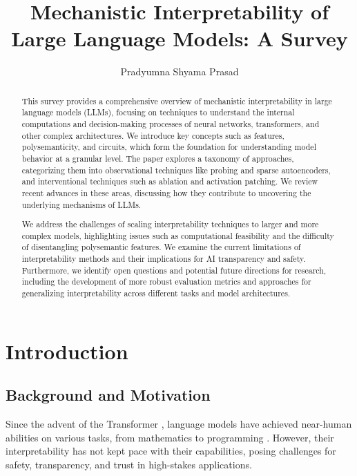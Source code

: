 \documentclass[sigconf,authoryear]{acmart}
\title{Mechanistic Interpretability of Large Language Models: A Survey}
\author{Pradyumna Shyama Prasad}
\begin{document}
\begin{abstract}
  This survey provides a comprehensive overview of mechanistic interpretability in large language models (LLMs), focusing on techniques to understand the internal computations and decision-making processes of neural networks, transformers, and other complex architectures. We introduce key concepts such as features, polysemanticity, and circuits, which form the foundation for understanding model behavior at a granular level. The paper explores a taxonomy of approaches, categorizing them into observational techniques like probing and sparse autoencoders, and interventional techniques such as ablation and activation patching. We review recent advances in these areas, discussing how they contribute to uncovering the underlying mechanisms of LLMs.

  We address the challenges of scaling interpretability techniques to larger and more complex models, highlighting issues such as computational feasibility and the difficulty of disentangling polysemantic features. We examine the current limitations of interpretability methods and their implications for AI transparency and safety. Furthermore, we identify open questions and potential future directions for research, including the development of more robust evaluation metrics and approaches for generalizing interpretability across different tasks and model architectures.
  
  
  
  \end{abstract}




\maketitle

\section{Introduction}

\subsection{Background and Motivation}
Since the advent of the Transformer \citep{vaswani2023attentionneed}, language models have achieved near-human abilities on various tasks, from mathematics to programming \citep{qwen2math2024,dubey2024llama3herdmodels,openai2024gpt4technicalreport}. However, their interpretability has not kept pace with their capabilities, posing challenges for safety, transparency, and trust in high-stakes applications.
\end{document}
